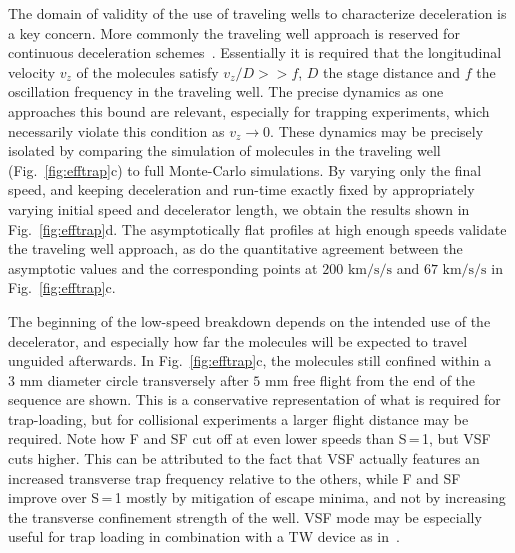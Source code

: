 \documentclass[%
 reprint,
 amsmath,amssymb,
 aps,
prl,
]{revtex4-1}
\begin{document}
The domain of validity of the use of traveling wells to characterize deceleration is a key concern.
More commonly the traveling well approach is reserved for continuous deceleration schemes~\cite{Osterwalder2010,Narevicius2008}.
Essentially it is required that the longitudinal velocity $v_z$ of the molecules satisfy $v_z/D >> f$, $D$ the stage distance and $f$ the oscillation frequency in the traveling well.
The precise dynamics as one approaches this bound are relevant, especially for trapping experiments, which necessarily violate this condition as $v_z\rightarrow 0$.
These dynamics may be precisely isolated by comparing the simulation of molecules in the traveling well (Fig.~\ref{fig:efftrap}c) to full Monte-Carlo simulations.
By varying only the final speed, and keeping deceleration and run-time exactly fixed by appropriately varying initial speed and decelerator length, we obtain the results shown in Fig.~\ref{fig:efftrap}d.
The asymptotically flat profiles at high enough speeds validate the traveling well approach, as do the quantitative agreement between the asymptotic values and the corresponding points at $200\text{ km/s/s}$ and $67\text{ km/s/s}$ in Fig.~\ref{fig:efftrap}c.

The beginning of the low-speed breakdown depends on the intended use of the decelerator, and especially how far the molecules will be expected to travel unguided afterwards.
In Fig.~\ref{fig:efftrap}c, the molecules still confined within a $3\text{ mm}$ diameter circle transversely after $5\text{ mm}$ free flight from the end of the sequence are shown. 
This is a conservative representation of what is required for trap-loading, but for collisional experiments a larger flight distance may be required.
Note how F and SF cut off at even lower speeds than S\,=\,1, but VSF cuts higher. 
This can be attributed to the fact that VSF actually features an increased transverse trap frequency relative to the others, while F and SF improve over S\,=\,1 mostly by mitigation of escape minima, and not by increasing the transverse confinement strength of the well.
VSF mode may be especially useful for trap loading in combination with a TW device as in~\cite{Quintero-Perez2013}.
\end{document}
